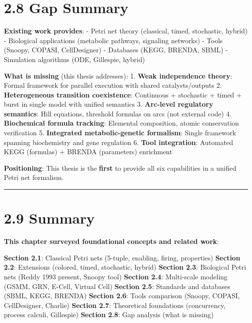 \hypertarget{gap-summary}{%
\section{2.8 Gap Summary}\label{gap-summary}}

\textbf{Existing work provides}: - \checkmark Petri net theory (classical,
timed, stochastic, hybrid) - \checkmark Biological applications (metabolic
pathways, signaling networks) - \checkmark Tools (Snoopy, COPASI, CellDesigner)
- \checkmark Databases (KEGG, BRENDA, SBML) - \checkmark Simulation algorithms (ODE,
Gillespie, hybrid)

\textbf{What is missing} (this thesis addresses): 1. \textbf{Weak
independence theory}: Formal framework for parallel execution with
shared catalysts/outputs 2. \textbf{Heterogeneous transition
coexistence}: Continuous + stochastic + timed + burst in single model
with unified semantics 3. \textbf{Arc-level regulatory semantics}: Hill
equations, threshold formulas on arcs (not external code) 4.
\textbf{Biochemical formula tracking}: Elemental composition, atomic
conservation verification 5. \textbf{Integrated metabolic-genetic
formalism}: Single framework spanning biochemistry and gene regulation
6. \textbf{Tool integration}: Automated KEGG (formulas) + BRENDA
(parameters) enrichment

\textbf{Positioning}: This thesis is the \textbf{first} to provide all
six capabilities in a unified Petri net formalism.

\begin{center}\rule{0.5\linewidth}{0.5pt}\end{center}

\hypertarget{summary}{%
\section{2.9 Summary}\label{summary}}

\textbf{This chapter surveyed foundational concepts and related work}:

\textbf{Section 2.1}: Classical Petri nets (5-tuple, enabling, firing,
properties) \textbf{Section 2.2}: Extensions (colored, timed,
stochastic, hybrid) \textbf{Section 2.3}: Biological Petri nets (Reddy
1993 \textrightarrow present, Snoopy tool) \textbf{Section 2.4}: Multi-scale modeling
(GSMM, GRN, E-Cell, Virtual Cell) \textbf{Section 2.5}: Standards and
databases (SBML, KEGG, BRENDA) \textbf{Section 2.6}: Tools comparison
(Snoopy, COPASI, CellDesigner, Charlie) \textbf{Section 2.7}:
Theoretical foundations (concurrency, process calculi, Gillespie)
\textbf{Section 2.8}: Gap analysis (what is missing)


